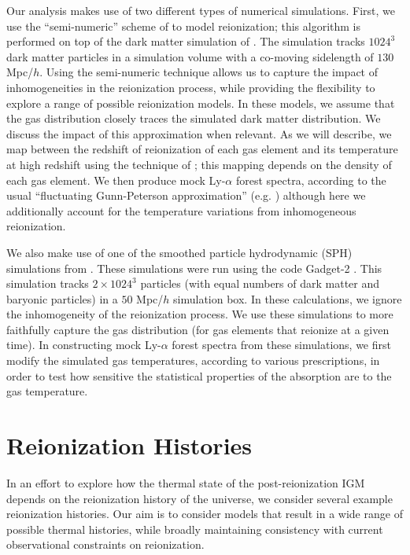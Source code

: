 Our analysis makes use of two different types of numerical simulations. First, we use the ``semi-numeric'' scheme of
\citet{Zahn:2006sg} to model reionization; this algorithm is performed 
on top of the dark matter simulation of \citet{McQuinn:2007dy}. The \citet{McQuinn:2007dy} simulation
tracks $1024^3$ dark matter particles in a simulation volume with a co-moving sidelength of $130$ Mpc/$h$. 
Using the semi-numeric technique allows
us to capture the impact of inhomogeneities in the reionization process, while providing the flexibility to explore a range
of possible reionization models. In these models, we assume that the gas distribution closely traces the simulated dark
matter distribution. We discuss the impact of this approximation when relevant.
As we will describe,
we map between the redshift of reionization of each gas element and its temperature at high redshift using the technique
of \citet{Hui:1997dp}; this mapping depends on the density of each gas element. We then produce mock Ly-$\alpha$ forest
spectra, according to the usual ``fluctuating Gunn-Peterson approximation'' (e.g. \citealt{MiraldaEscude:1995bu,Croft:2000hs}) although here 
we additionally account for the temperature
variations from inhomogeneous reionization.

We also make use of one of the smoothed particle hydrodynamic (SPH) simulations from \citet{Lidz:2009ca}. These simulations 
were run using the code Gadget-2 \citep{2005MNRAS.364.1105S}. This simulation tracks $2\times 1024^3$ particles
(with equal numbers of dark matter and baryonic particles) in a $50$ Mpc/$h$ simulation box. In these calculations, we ignore
the inhomogeneity of the reionization process. We use these simulations to more faithfully capture the gas distribution (for
gas elements that reionize at a given time). In constructing mock Ly-$\alpha$ forest spectra from these simulations, we first
modify the simulated gas temperatures, according to various prescriptions, in order to test how sensitive the statistical properties of the
absorption are to the gas temperature.


\section{Reionization Histories}
\label{sec:reion_hist}


In an effort to explore how the thermal state of the post-reionization 
IGM depends on the reionization history of the universe, we consider several example reionization histories. 
Our aim is to consider models that result in a wide range of possible thermal histories, while broadly maintaining 
consistency with current observational constraints on reionization. 

